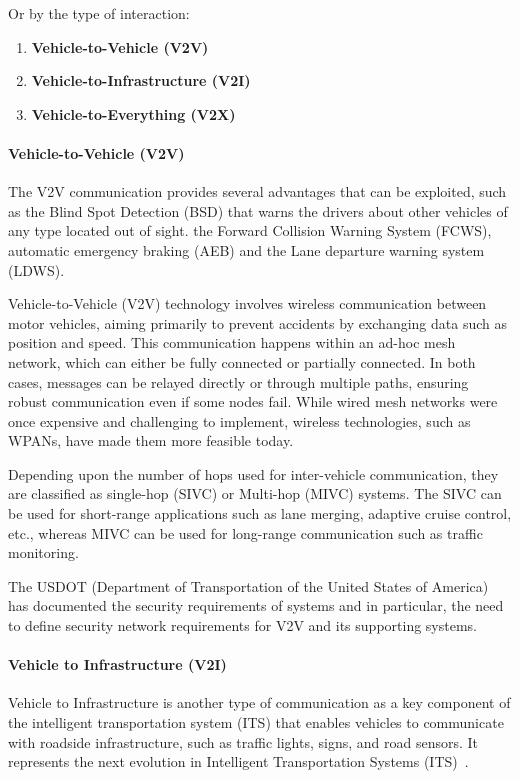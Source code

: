 Or by the type of interaction:
\begin{enumerate}
    \item \textbf{Vehicle-to-Vehicle (V2V)}
    \item \textbf{Vehicle-to-Infrastructure (V2I)}
    \item \textbf{Vehicle-to-Everything (V2X)}
\end{enumerate}

\paragraph{Vehicle-to-Vehicle (V2V)}

The V2V communication provides several advantages that can be exploited, such as the Blind Spot Detection (BSD) that warns the drivers about other vehicles of any type located out of sight.
the Forward Collision Warning System (FCWS), automatic emergency braking (AEB) and the Lane departure warning system (LDWS)\cite{arena2019overview}.

Vehicle-to-Vehicle (V2V) technology involves wireless communication between motor vehicles, aiming primarily to prevent accidents by exchanging data such as position and speed.
This communication happens within an ad-hoc mesh network, which can either be fully connected or partially connected.
In both cases, messages can be relayed directly or through multiple paths, ensuring robust communication even if some nodes fail.
While wired mesh networks were once expensive and challenging to implement, wireless technologies, such as WPANs, have made them more feasible today\cite{arena2019overview}.

Depending upon the number of hops used for inter-vehicle communication, they are classified as single-hop (SIVC) or
Multi-hop (MIVC) systems.
The SIVC can be used for short-range applications such as
lane merging, adaptive cruise control, etc., whereas MIVC can be used for long-range communication such as traffic monitoring\cite{zheng2020cooperative}.

The USDOT (Department of Transportation of the United States of America) has documented the security requirements of
systems and in particular, the need to define security network requirements for V2V and its supporting systems\cite{dot2021v2v}.

\paragraph{Vehicle to Infrastructure (V2I)}
Vehicle to Infrastructure is another type of communication as a key component of the intelligent transportation system (ITS)
that enables vehicles to communicate with roadside infrastructure, such as traffic lights, signs, and road sensors.
It represents the next evolution in Intelligent Transportation Systems (ITS)~\cite{dot2024v2i}.

